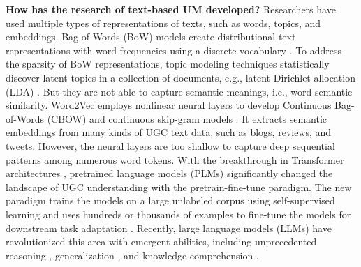 \documentclass[11pt]{article}
\begin{document}
\vspace{0.05in}
\noindent \textbf{How has the research of text-based UM developed?} Researchers have used multiple types of representations of texts, such as words, topics, and embeddings. 
Bag-of-Words (BoW) models create distributional text representations with word frequencies using a discrete vocabulary \cite{harris1954distributional}.
To address the sparsity of BoW representations, topic modeling techniques statistically discover latent topics in a collection of documents, e.g., latent Dirichlet allocation (LDA) \cite{blei2003latent}.
But they are not able to capture semantic meanings, i.e., word semantic similarity.
Word2Vec employs nonlinear neural layers to develop Continuous Bag-of-Words (CBOW) and continuous skip-gram models \cite{mikolov2013efficient}. It extracts semantic embeddings from many kinds of UGC text data, such as blogs, reviews, and tweets.
However, the neural layers are too shallow to capture deep sequential patterns among numerous word tokens.
With the breakthrough in Transformer architectures \cite{vaswani2017attention}, pretrained language models (PLMs) significantly changed the landscape of UGC understanding with the pretrain-fine-tune paradigm. The new paradigm trains the models on a large unlabeled corpus using self-supervised learning and uses hundreds or thousands of examples to fine-tune the models for downstream task adaptation \cite{kenton2019bert}. Recently, large language models (LLMs) have revolutionized this area with emergent abilities, including unprecedented reasoning \cite{wei2022chain, yao2023tree}, generalization \cite{wei2021finetuned, radford2019language}, and knowledge comprehension \cite{sun2023head,pan2023unifying}.
\end{document}
